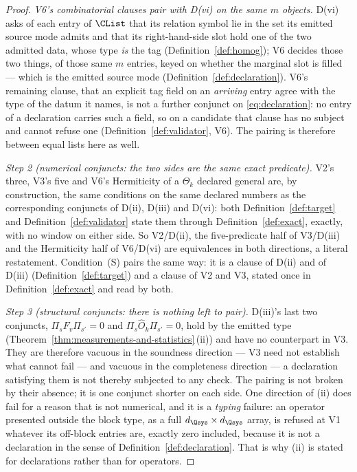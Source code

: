 \begin{proof}
\emph{V6's combinatorial clauses pair with D(vi) on the same $m$ objects.}
D(vi) asks of each entry of $\CList$ that its relation symbol lie in the set
its emitted source mode admits and that its right-hand-side slot hold one of
the two admitted data, whose type \emph{is} the tag
(Definition~\ref{def:homog}); V6 decides those two things, of those same $m$
entries, keyed on whether the marginal slot is filled --- which is the
emitted source mode (Definition~\ref{def:declaration}). V6's remaining
clause, that an explicit tag field on an \emph{arriving} entry agree with the
type of the datum it names, is not a further conjunct on
\eqref{eq:declaration}: no entry of a declaration carries such a field, so on
a candidate that clause has no subject and cannot refuse one
(Definition~\ref{def:validator}, V6). The pairing is therefore between equal
lists here as well.

\emph{Step 2 (numerical conjuncts: the two sides are the same exact
predicate).} V2's three, V3's five and V6's Hermiticity of a $\Theta_k$
declared general are, by construction, the same conditions on the same
declared numbers as the corresponding conjuncts of D(ii), D(iii) and D(vi):
both Definition~\ref{def:target} and Definition~\ref{def:validator} state
them through Definition~\ref{def:exact}, exactly, with no window on either
side. So V2/D(ii), the five-predicate half of V3/D(iii) and the Hermiticity
half of V6/D(vi) are equivalences in both directions, a literal restatement.
Condition~(S) pairs the same way: it is a clause of D(ii) and of D(iii)
(Definition~\ref{def:target}) and a clause of V2 and V3, stated once in
Definition~\ref{def:exact} and read by both.

\emph{Step 3 (structural conjuncts: there is nothing left to pair).} D(iii)'s
last two conjuncts, $\Pi_sF_v\Pi_{s'}=0$ and $\Pi_s\hat O_k\Pi_{s'}=0$, hold
by the emitted type (Theorem~\ref{thm:measurements-and-statistics}\,(ii)) and have no counterpart in
V3. They are therefore vacuous in the soundness direction --- V3 need not
establish what cannot fail --- and vacuous in the completeness direction ---
a declaration satisfying them is not thereby subjected to any check. The
pairing is not broken by their absence; it is one conjunct shorter on each
side. One direction of (ii) does fail for a reason that is not numerical, and
it is a \emph{typing} failure: an operator presented outside the block type,
as a full $d_{\Qsys}\times d_{\Qsys}$ array, is refused at V1 whatever its
off-block entries are, exactly zero included, because it is not a declaration
in the sense of Definition~\ref{def:declaration}. That is why (ii) is stated
for declarations rather than for operators.


\end{proof}
